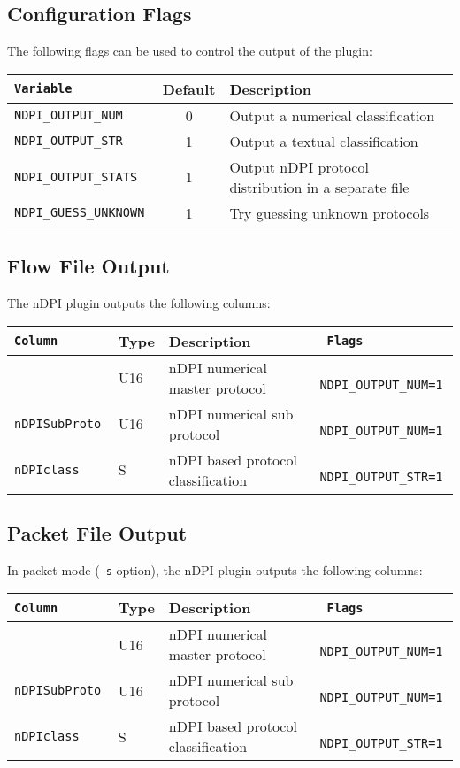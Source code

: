 \documentclass[documentation]{subfiles}
\begin{document}
\subsection{Configuration Flags}
The following flags can be used to control the output of the plugin:
\begin{longtable}{>{\tt}lcl}
    \toprule
    {\bf Variable} & {\bf Default} & {\bf Description} \\
    \midrule\endhead%
    NDPI\_OUTPUT\_NUM    & 0 & Output a numerical classification\\
    NDPI\_OUTPUT\_STR    & 1 & Output a textual classification\\
    NDPI\_OUTPUT\_STATS  & 1 & Output nDPI protocol distribution in a separate file\\
    NDPI\_GUESS\_UNKNOWN & 1 & Try guessing unknown protocols\\
    \bottomrule
\end{longtable}

\subsection{Flow File Output}
The nDPI plugin outputs the following columns:
\begin{longtable}{>{\tt}lll>{\tt\small}l}
    \toprule
    {\bf Column} & {\bf Type} & {\bf Description} & {\bf Flags}\\
    \midrule\endhead%
    \nameref{nDPIMstrProto} & U16 & nDPI numerical master protocol     & NDPI\_OUTPUT\_NUM=1\\
    nDPISubProto            & U16 & nDPI numerical sub protocol        & NDPI\_OUTPUT\_NUM=1\\
    nDPIclass               & S   & nDPI based protocol classification & NDPI\_OUTPUT\_STR=1\\
    \bottomrule
\end{longtable}

\subsection{Packet File Output}
In packet mode ({\tt --s} option), the nDPI plugin outputs the following columns:
\begin{longtable}{>{\tt}lll>{\tt\small}l}
    \toprule
    {\bf Column} & {\bf Type} & {\bf Description} & {\bf Flags}\\
    \midrule\endhead%
    \nameref{nDPIMstrProto} & U16 & nDPI numerical master protocol     & NDPI\_OUTPUT\_NUM=1\\
    nDPISubProto            & U16 & nDPI numerical sub protocol        & NDPI\_OUTPUT\_NUM=1\\
    nDPIclass               & S   & nDPI based protocol classification & NDPI\_OUTPUT\_STR=1\\
    \bottomrule
\end{longtable}
\end{document}
